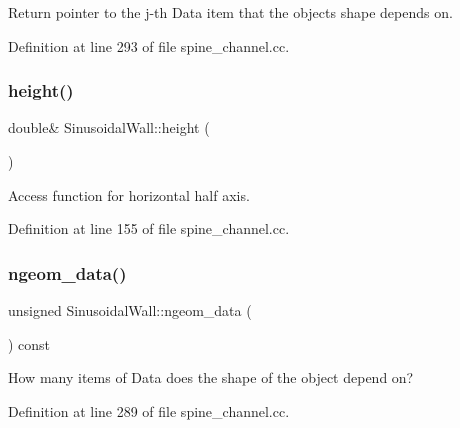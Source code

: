 Return pointer to the j-\/th Data item that the object\textquotesingle{}s shape depends on. 



Definition at line 293 of file spine\+\_\+channel.\+cc.

\mbox{\label{classSinusoidalWall_a78861ab97b81bc78e05c3ec260c6479d}} 
\subsubsection{\texorpdfstring{height()}{height()}}
{\footnotesize\ttfamily double\& Sinusoidal\+Wall\+::height (\begin{DoxyParamCaption}{ }\end{DoxyParamCaption})\hspace{0.3cm}{\ttfamily [inline]}}



Access function for horizontal half axis. 



Definition at line 155 of file spine\+\_\+channel.\+cc.

\mbox{\label{classSinusoidalWall_ada343bc36f0d4dd1a0b79da62d10c33d}} 
\subsubsection{\texorpdfstring{ngeom\+\_\+data()}{ngeom\_data()}}
{\footnotesize\ttfamily unsigned Sinusoidal\+Wall\+::ngeom\+\_\+data (\begin{DoxyParamCaption}{ }\end{DoxyParamCaption}) const\hspace{0.3cm}{\ttfamily [inline]}}



How many items of Data does the shape of the object depend on? 



Definition at line 289 of file spine\+\_\+channel.\+cc.

\mbox{\label{classSinusoidalWall_a8a1ce17bdb30f20894e1d85668877502}} 
